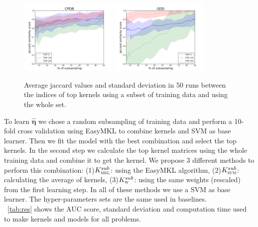 \documentclass{esannV2}
\newcommand{\1}{{\bf 1}}
\newcommand{\ksmkl}{$K_{\textsc{mkl}}^{sub}$}
\newcommand{\kssum}{$K_{\textsc{sum}}^{sub}$}
\newcommand{\ksw}{$K_{\textsc{w}}^{sub}$}
\begin{document}
\begin{figure}[!htb]
\centering
\includegraphics[width=0.42\textwidth]{img/CPDBh.png}
\includegraphics[width=0.42\textwidth]{img/GDDh.png}
\caption{Average jaccard values and standard deviation in 50 runs between the indices of top kernels using a subset of training data and using the whole set.}
\label{fig:jaccard}
\end{figure}

To learn $\hat{\boldsymbol{\eta}}$ we chose a random subsampling of training data and perform a 10-fold cross validation using EasyMKL to combine kernels and SVM as base learner. Then we fit the model with the best combination and select the top kernels.
In the second step we calculate the top kernel matrices using the whole training data and combine it to get the kernel. We propose 3 different methods to perform this combination:
(1)\ksmkl: using the EasyMKL algorithm, (2)\kssum: calculating the average of kernels, (3)\ksw: using the same weights (rescaled) from the first learning step.
In all of these methods we use a SVM as base learner. The hyper-parameters sets are the same used in baselines.\\
\tablename\ \ref{tab:res} shows the AUC score, standard deviation and computation time used to make kernels and models for all problems.
\end{document}
